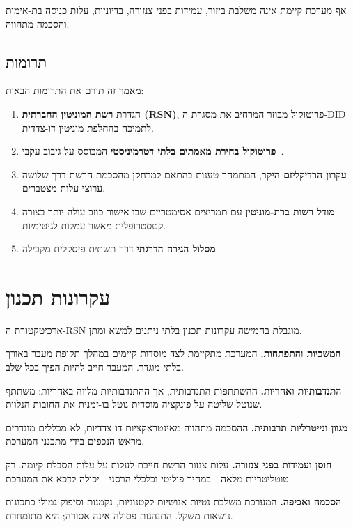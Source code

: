 \documentclass[11pt,a4paper,twocolumn]{article}
\begin{document}
אף מערכת קיימת אינה משלבת ביזור, עמידות בפני צנזורה, בדיוניות, עלות כניסה בת-אימות והסכמה מתהווה.

\subsection{תרומות}

מאמר זה תורם את התרומות הבאות:
\begin{enumerate}[nosep]
\item הגדרת \textbf{רשת המוניטין החברתית (RSN)}, פרוטוקול מבוזר המרחיב את מסגרת ה-DID לתמיכה בהחלפת מוניטין דו-צדדית.
\item \textbf{פרוטוקול בחירת מאמתים בלתי דטרמיניסטי} המבוסס על גיבוב עקבי~\cite{karger1997}.
\item \textbf{עקרון הרדיקליזם היקר}, המתמחר טענות בהתאם למרחקן מהסכמת הרשת דרך שלושה ערוצי עלות מצטברים.
\item \textbf{מודל רשות ברת-מוניטין} עם תמריצים אסימטריים שבו אישור כוזב עולה יותר בצורה קטסטרופלית מאשר עמלות לגיטימיות.
\item \textbf{מסלול הגירה הדרגתי} דרך תשתית פיסקלית מקבילה.
\end{enumerate}

\section{עקרונות תכנון}

ארכיטקטורת ה-RSN מוגבלת בחמישה עקרונות תכנון בלתי ניתנים למשא ומתן.

\textbf{המשכיות והתפתחות.} המערכת מתקיימת לצד מוסדות קיימים במהלך תקופת מעבר באורך בלתי מוגדר. המעבר חייב להיות הפיך בכל שלב.

\textbf{התנדבותיות ואחריות.} ההשתתפות התנדבותית, אך ההתנדבותיות מלווה באחריות: משתתף שנוטל שליטה על פונקציה מוסדית נוטל בו-זמנית את החובות הנלוות.

\textbf{מגוון ונייטרליות תרבותית.} ההסכמה מתהווה מאינטראקציות דו-צדדיות, לא מכללים מוגדרים מראש הנכפים בידי מתכנני המערכת.

\textbf{חוסן ועמידות בפני צנזורה.} עלות צנזור הרשת חייבת לעלות על עלות הסבלת קיומה. רק טוטליטריות מלאה---במחיר פוליטי וכלכלי הרסני---יכולה לדכא את המערכת.

\textbf{הסכמה ואכיפה.} המערכת משלבת נטיות אנושיות לקטנוניות, נקמנות וסיפוק גמולי כתכונות נושאות-משקל. התנהגות פסולה אינה אסורה; היא מתומחרת.
\end{document}
